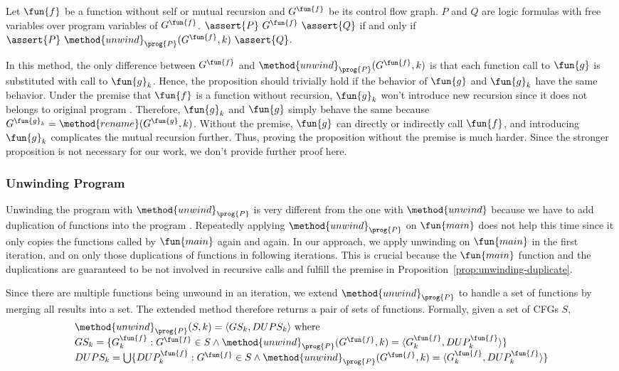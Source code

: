 \begin{proposition}\label{prop:unwinding-duplicate}
  Let $\fun{f}$ be a function without self or mutual recursion and 
  $G^\fun{f}$ be its control flow graph.
  $P$ and $Q$ are logic formulas with free variables over program variables of
  $G^\fun{f}$.
  $\assert{P}\ G^\fun{f}\ \assert{Q}$ if and only if 
  $\assert{P}\ \method{unwind}_\prog{P}(G^\fun{f}, k)\ \assert{Q}$.
\end{proposition}
In this method, the only difference between $G^\fun{f}$ and
$\method{unwind}_\prog{P}(G^\fun{f}, k)$ is that each function call to
$\fun{g}$ is substituted with call to $\fun{g}_k$.
Hence, the proposition should trivially hold if the behavior of $\fun{g}$ and
$\fun{g}_k$ have the same behavior.
Under the premise that $\fun{f}$ is a function without recursion,
$\fun{g}_k$ won't introduce new recursion since it does not belongs to original
program .
Therefore, $\fun{g}_k$ and $\fun{g}$ simply behave the same because 
$G^{\fun{g}_k} = \method{rename}(G^\fun{g},k)$.
Without the premise, $\fun{g}$ can directly or indirectly call $\fun{f}$,
and introducing $\fun{g}_k$ complicates the mutual recursion further.
Thus, proving the proposition without the premise is much harder.
Since the stronger proposition is not necessary for our work,
we don't provide further proof here.

\subsubsection*{Unwinding Program}
Unwinding the program with $\method{unwind}_\prog{P}$ is very different from
the one with $\method{unwind}$ because we have to add duplication of functions
into the program .
Repeatedly applying $\method{unwind}_\prog{P}$ on $\fun{main}$ does not help
this time since it only copies the functions called by $\fun{main}$ again
and again.
In our approach, we apply unwinding on $\fun{main}$ in the first iteration,
and on only those duplications of functions in following iterations.
This is crucial because the $\fun{main}$ function and the duplications are
guaranteed to be not involved in recursive calls and fulfill the premise in
Proposition~\ref{prop:unwinding-duplicate}.

Since there are multiple functions being unwound in an iteration,
we extend $\method{unwind}_\prog{P}$ to handle a set of functions by merging
all results into a set.
The extended method therefore returns a pair of sets of functions.
Formally, given a set of CFGs $S$,
\[
\begin{array}{l}
\method{unwind}_\prog{P}(S, k) = \langle GS_k, DUPS_k \rangle \text{ where}\\
GS_k = \{G^\fun{f}_k : G^\fun{f} \in S
  \land \method{unwind}_\prog{P}(G^\fun{f}, k) 
        = \langle G^\fun{f}_k, DUP^\fun{f}_k \rangle
  \} \\
  
DUPS_k = \bigcup\{
  DUP^\fun{f}_k : G^\fun{f} \in S
  \land \method{unwind}_\prog{P}(G^\fun{f}, k) 
        = \langle G^\fun{f}_k, DUP^\fun{f}_k \rangle
  \} \\
\end{array}
\]

